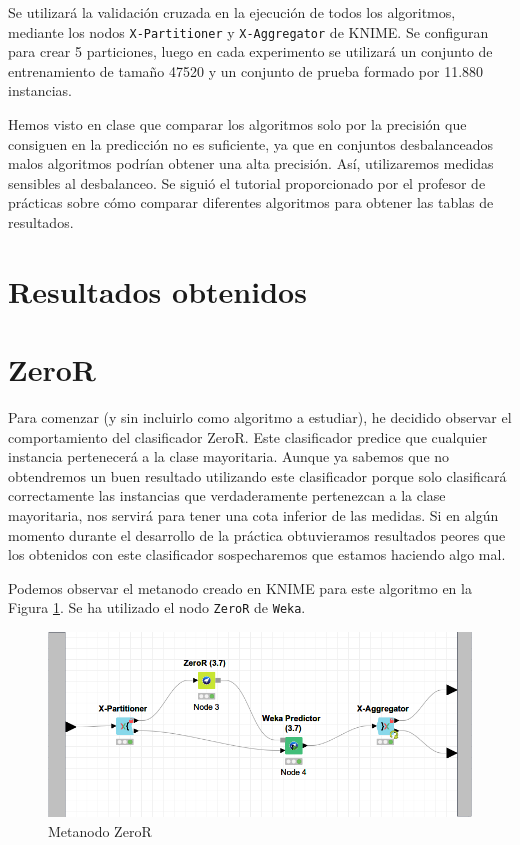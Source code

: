 \documentclass[a4paper, 17pt]{article}
\begin{document}
Se utilizará la validación cruzada en la ejecución de todos los algoritmos, mediante los nodos \texttt{X-Partitioner} y \texttt{X-Aggregator} de KNIME. Se configuran para crear 5 particiones, luego en cada experimento se utilizará un conjunto de entrenamiento de tamaño 47520 y un conjunto de prueba formado por 11.880 instancias.

Hemos visto en clase que comparar los algoritmos solo por la precisión que consiguen en la predicción no es suficiente, ya que en conjuntos desbalanceados malos algoritmos podrían obtener una alta precisión. Así, utilizaremos medidas sensibles al desbalanceo. Se siguió el tutorial proporcionado por el profesor de prácticas sobre cómo comparar diferentes algoritmos para obtener las tablas de resultados.
\section{Resultados obtenidos}
\section{ZeroR}
Para comenzar (y sin incluirlo como algoritmo a estudiar), he decidido observar el comportamiento del clasificador ZeroR. Este clasificador predice que cualquier instancia pertenecerá a la clase mayoritaria. Aunque ya sabemos que no obtendremos un buen resultado utilizando este clasificador porque solo clasificará correctamente las instancias que verdaderamente pertenezcan a la clase mayoritaria, nos servirá para tener una cota inferior de las medidas. Si en algún momento durante el desarrollo de la práctica obtuvieramos resultados peores que los obtenidos con este clasificador sospecharemos que estamos haciendo algo mal.

Podemos observar el metanodo creado en KNIME para este algoritmo en la Figura \ref{fig:zeroR}. Se ha utilizado el nodo \texttt{ZeroR} de \texttt{Weka}.

\begin{figure}[H]
    \centering
    \includegraphics[width=1\textwidth]{ZeroR}
    \caption{Metanodo ZeroR}
    \label{fig:zeroR}
\end{figure}
\end{document}
